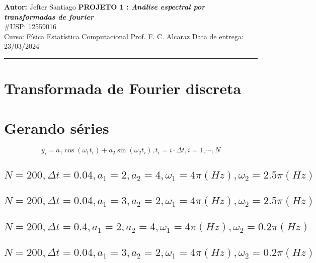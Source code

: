 \documentclass[a4paper, 11pt]{article}
\begin{document}
\noindent
\large\textbf{Autor:} Jefter Santiago \hfill \textbf{PROJETO 1 : \emph{Análise espectral por transformadas de fourier}}   \\
\#USP: 12559016 \\
\normalsize Curso: Física Estatística Computacional 
Prof. F. C. Alcaraz \hfill Data de entrega: 23/03/2024 \\
\noindent\rule{7in}{2.8pt}


\section{Transformada de Fourier discreta}

\section{Gerando séries}

\begin{equation}
  y_i = a_1 \cos (\omega_1 t_i)   + a_2 \sin (\omega_2 t_i) , t_i = i \cdot  \Delta t , i = 1, \cdots , N
  \label{eq:series}
\end{equation}

\subsection{$N = 200, \Delta t = 0.04, a_1 = 2, a_2 = 4, \omega_1 = 4\pi (Hz), \omega_2 = 2.5 \pi (Hz)$}
\subsection{$N = 200, \Delta t = 0.04, a_1 = 3, a_2 = 2, \omega_1 = 4\pi (Hz), \omega_2 = 2.5 \pi (Hz)$}
\subsection{$N = 200, \Delta t = 0.4, a_1 = 2, a_2 = 4, \omega_1 = 4\pi (Hz), \omega_2 = 0.2 \pi (Hz)$}
\subsection{$N = 200, \Delta t = 0.04, a_1 = 3, a_2 = 2, \omega_1 = 4\pi (Hz), \omega_2 = 0.2 \pi (Hz)$}
\end{document}
